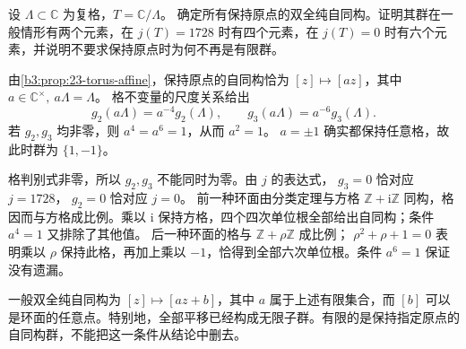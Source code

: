 \begin{exercise}\label{b3:ex:23-8}
设 \(\Lambda\subset\mathbb C\) 为复格，\(T=\mathbb C/\Lambda\)。
确定所有保持原点的双全纯自同构。证明其群在一般情形有两个元素，在 \(j(T)=1728\) 时有四个元素，在 \(j(T)=0\) 时有六个元素，并说明不要求保持原点时为何不再是有限群。
\end{exercise}
\begin{solution}
由\cref{b3:prop:23-torus-affine}，保持原点的自同构恰为
\([z]\mapsto[az]\)，其中 \(a\in\mathbb C^\times,\ a\Lambda=\Lambda\)。
格不变量的尺度关系给出
\[
g_2(a\Lambda)=a^{-4}g_2(\Lambda),\qquad
g_3(a\Lambda)=a^{-6}g_3(\Lambda).
\]
若 \(g_2,g_3\) 均非零，则 \(a^4=a^6=1\)，从而 \(a^2=1\)。
\(a=\pm1\) 确实都保持任意格，故此时群为 \(\{1,-1\}\)。

格判别式非零，所以 \(g_2,g_3\) 不能同时为零。由 \(j\) 的表达式，
\(g_3=0\) 恰对应 \(j=1728\)，
\(g_2=0\) 恰对应 \(j=0\)。
前一种环面由分类定理与方格 \(\mathbb Z+\mathrm{i}\mathbb Z\) 同构，格因而与方格成比例。乘以 \(\mathrm{i}\) 保持方格，四个四次单位根全部给出自同构；条件 \(a^4=1\) 又排除了其他值。
后一种环面的格与 \(\mathbb Z+\rho\mathbb Z\) 成比例；
\(\rho^2+\rho+1=0\) 表明乘以 \(\rho\) 保持此格，再加上乘以 \(-1\)，恰得到全部六次单位根。条件 \(a^6=1\) 保证没有遗漏。

一般双全纯自同构为 \([z]\mapsto[az+b]\)，其中 \(a\) 属于上述有限集合，而 \([b]\) 可以是环面的任意点。特别地，全部平移已经构成无限子群。有限的是保持指定原点的自同构群，不能把这一条件从结论中删去。
\end{solution}
